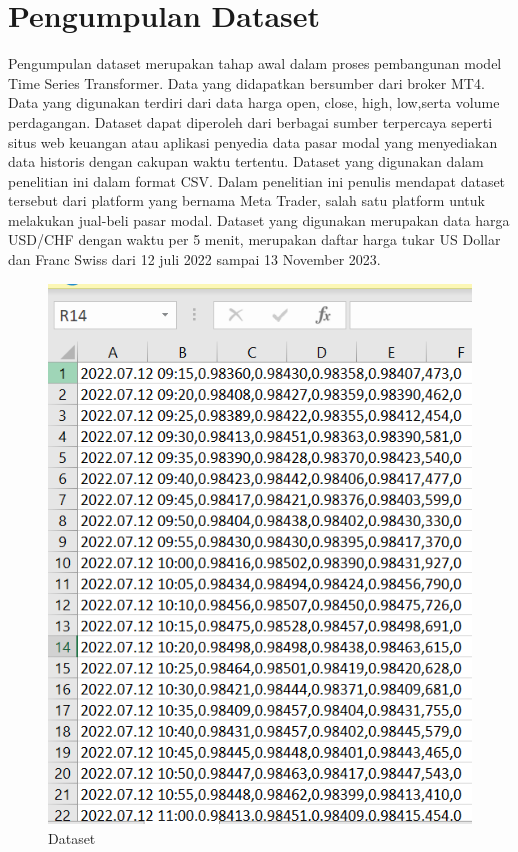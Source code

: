 \section{Pengumpulan Dataset}
Pengumpulan dataset merupakan tahap awal dalam proses pembangunan model Time Series Transformer. Data yang didapatkan bersumber dari broker MT4.
Data yang digunakan terdiri dari data harga open, close, high, low,serta volume perdagangan. Dataset dapat diperoleh dari berbagai sumber terpercaya seperti situs web keuangan atau aplikasi penyedia data pasar modal yang menyediakan data historis dengan cakupan waktu tertentu. Dataset yang digunakan dalam penelitian ini dalam format CSV. Dalam penelitian ini penulis mendapat dataset tersebut dari platform yang bernama Meta Trader, salah satu platform untuk melakukan jual-beli pasar modal. Dataset yang digunakan merupakan data harga USD/CHF dengan waktu per 5 menit, merupakan daftar harga tukar US Dollar dan Franc Swiss dari 12 juli 2022 sampai 13 November 2023. 

\begin{figure} [H] \centering
  \includegraphics[scale=1.0]{gambar/gambar pengumpulan datset.png} 
    \caption{Dataset}
    \label{fig:dataset}
\end{figure}

